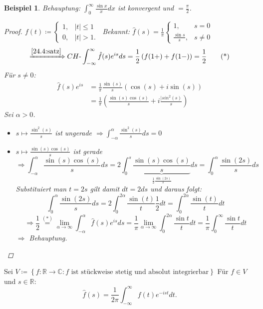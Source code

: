 \documentclass[12pt]{extreport} %
\newcommand{\C}{\mathbb{C}}
\newcommand{\R}{\mathbb{R}}
\theoremstyle{named}
\theoremstyle{nnamed}
\theoremstyle{itshape}
\theoremstyle{normal}
\newtheorem*{beispiel*}{Beispiel}
\begin{document}
\begin{beispiel*}
	Behauptung: $\int_{0}^{\infty} \frac{\sin x}{x} dx$ ist konvergent und $= \frac{\pi}{2}$.
	
	\begin{proof}
		$f(t) \coloneqq \begin{cases} 1, & |t| \leq 1 \\ 0, & |t| > 1. \end{cases}~$ Bekannt: $\hat{f}(s) = \frac{1}{\pi} \begin{cases} 1, & s = 0 \\ \frac{\sin s}{s}, & s \neq 0 \end{cases}$
		\begin{equation*}
			\xRightarrow[]{\ref{24.4:satz}} CH\text{-}\int_{-\infty}^{\infty} \hat{f}(s) e^{is} ds = \frac{1}{2} \left( f(1+) + f(1-) \right) = \frac{1}{2}  \tag*{(*)}
		\end{equation*}
		Für $s \neq 0$:
			\begin{align*}
				\hat{f}(s) e^{is} & = \frac{1}{\pi} \frac{\sin(s)}{s} \left( \cos(s) + i \sin(s) \right) \\
				& = \frac{1}{\pi} \left( \frac{\sin(s) \cos(s)}{s} + i \frac{|sin^{2}(s)}{s} \right)
			\end{align*}
		Sei $\alpha > 0$.
		\begin{itemize}
			\item $s \mapsto \frac{\sin^{2}(s)}{s}$ ist ungerade $\Rightarrow \int_{-\alpha}^{\alpha} \frac{\sin^{2}(s)}{s} ds = 0$
			\item $s \mapsto \frac{\sin(s) \cos(s)}{s}$ ist gerade
				$$ \Rightarrow \int_{-\alpha}^{\alpha} \frac{\sin(s) \cos(s)}{s} ds = 2 \int_{0}^{s} \underbrace{\frac{\sin(s) \cos(s)}{s}}_{\frac{1}{2} \frac{\sin(2s)}{s}} ds = \int_{0}^{\alpha} \frac{\sin(2s)}{s} ds $$
				Substituiert man $t = 2s$ gilt damit $dt = 2 ds$ und daraus folgt:
				$$ \int_{0}^{\alpha} \frac{\sin(2s)}{s} ds = 2 \int_{0}^{2 \alpha} \frac{\sin(t)}{t} \frac{1}{2} dt = \int_{0}^{2 \alpha} \frac{\sin(t)}{t} dt $$
				$$ \Longrightarrow \frac{1}{2} \overset{(*)}{=} \lim_{\alpha \rightarrow \infty} \int_{-\alpha}^{\alpha} \hat{f}(s) e^{is} ds = \frac{1}{\pi} \lim_{\alpha \rightarrow \infty} \int_{0}^{2 \alpha} \frac{\sin t}{t} dt = \frac{1}{\pi} \int_{0}^{\infty} \frac{\sin t}{t} dt $$
				$\Rightarrow$ Behauptung.
		\end{itemize}
	\end{proof}	
\end{beispiel*}

Sei $V \coloneqq \left\{ f \colon \R \rightarrow \C \colon f \text{ ist stückweise stetig und absolut integrierbar} \right\}$ Für $f \in V$ und $s \in \R$: 
$$ \hat{f}(s) = \frac{1}{2\pi} \int_{-\infty}^{\infty} f(t) e^{-ist} dt. $$
\end{document}
